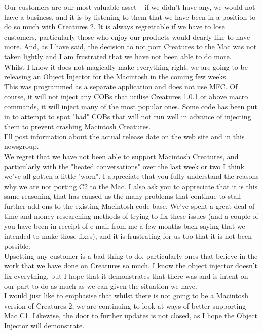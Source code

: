 \documentclass[11pt,twoside,a4paper]{article}
\begin{document}
\begin{multicols*}{2}
Our customers are our most valuable asset -- if we didn't have any, we would not have a business, and it is by listening to them that we have been in a position to do so much with Creatures 2. It is always regrettable if we have to lose customers, particularly those who enjoy our products would dearly like to have more. And, as I have said, the decision to not port Creatures to the Mac was not taken lightly and I am frustrated that we have not been able to do more.~\\

Whilst I know it does not magically make everything right, we are going to be releasing an Object Injector for the Macintosh in the coming few weeks.~\\
This was programmed as a separate application and does not use MFC. Of course, it will not inject any COBs that utilise Creatures 1.0.1 or above macro commands, it will inject many of the most popular ones. Some code has been put in to attempt to spot "bad" COBs that will not run well in advance of injecting them to prevent crashing Macintosh Creatures.~\\

I'll post information about the actual release date on the web site and in this newsgroup.~\\

We regret that we have not been able to support Macintosh Creatures, and particularly with the "heated conversations" over the last week or two I think we've all gotten a little "worn". I appreciate that you fully understand the reasons why we are not porting C2 to the Mac. I also ask you to appreciate that it is this same reasoning that has caused us the many problems that continue to stall further add-ons to the existing Macintosh code-base. We've spent a great deal of time and money researching methods of trying to fix these issues (and a couple of you have been in receipt of e-mail from me a few months back saying that we intended to make those fixes), and it is frustrating for us too that it is not been possible.~\\
Upsetting any customer is a bad thing to do, particularly ones that believe in the work that we have done on Creatures so much. I know the object injector doesn't fix everything, but I hope that it demonstrates that there was and is intent on our part to do as much as we can given the situation we have.~\\

I would just like to emphasise that whilst there is not going to be a Macintosh version of Creatures 2, we are continuing to look at ways of better supporting Mac C1. Likewise, the door to further updates is not closed, as I hope the Object Injector will demonstrate.~\\


\end{multicols*}
\end{document}
